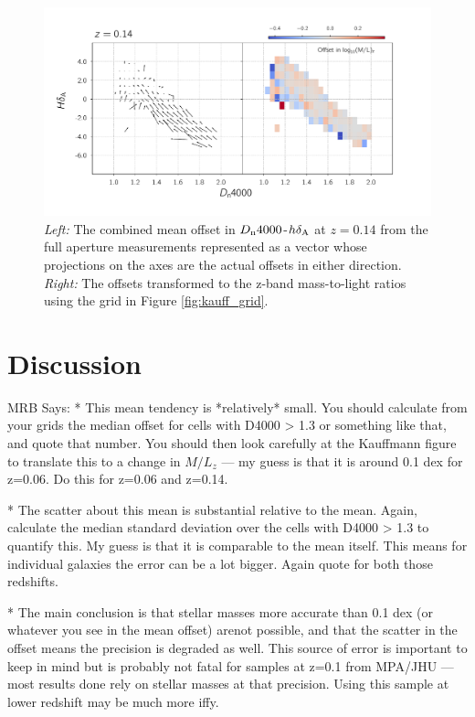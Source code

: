 \begin{figure}
\includegraphics[width=\textwidth]{figures/mlz_offset_c.pdf}
\caption[ \emph{Left:} The combined mean offset in $D_{\rm n}4000$-$h\delta_{\rm A}$ at $z=0.14$ from the full aperture measurements represented as a vector whose projections on the axes are the actual offsets in either direction. \emph{Right:} The offsets transformed to the z-band mass-to-light ratios using the grid in Figure \ref{fig:kauff_grid}. ]{ \emph{Left:} The combined mean offset in $D_{\rm n}4000$-$h\delta_{\rm A}$ at $z=0.14$ from the full aperture measurements represented as a vector whose projections on the axes are the actual offsets in either direction. \emph{Right:} The offsets transformed to the z-band mass-to-light ratios using the grid in Figure \ref{fig:kauff_grid}.
\label{fig:offset_quiver3}}
\end{figure}

\section{Discussion}

MRB Says: * This mean tendency is *relatively* small. You should calculate from your grids the median offset for cells with D4000 > 1.3 or something like that, and quote that number. You should then look carefully at the Kauffmann figure to translate this to a change in $M/L_z$ --- my guess is that it is around 0.1 dex for z=0.06. Do this for z=0.06 and z=0.14.

 * The scatter about this mean is substantial relative to the mean. Again, calculate the median standard deviation over the cells with D4000 > 1.3 to quantify this. My guess is that it is  comparable to the mean itself. This means for individual galaxies the error can be a lot bigger. Again quote for both those redshifts.

 * The main conclusion is that stellar masses more accurate than 0.1 dex (or whatever you see in the mean offset) arenot possible, and that the scatter in the offset means the precision is degraded as well. This source of error is important
to keep in mind but is probably not fatal for samples at z=0.1
from MPA/JHU --- most results done rely on stellar masses
at that precision. Using this sample at lower redshift may be
much more iffy.







